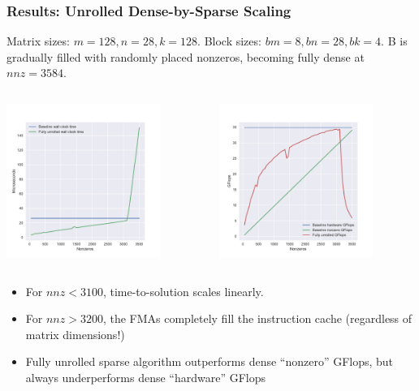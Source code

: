 \documentclass[9pt]{beamer}
\begin{document}
\begin{frame}[fragile]
  \frametitle{Results: Unrolled Dense-by-Sparse Scaling}
  Matrix sizes: $m=128, n=28, k=128$. Block sizes: $bm=8, bn=28, bk=4$.
  B is gradually filled with randomly placed nonzeros, becoming fully dense at $nnz=3584$.

  \begin{columns}[t]
    \begin{column}{0.45\textwidth}
      \centering
      \includegraphics[width=5cm]{images/unrolled_scaling_time.pdf}
    \end{column}
    \begin{column}{0.45\textwidth}
      \centering
      \includegraphics[width=5cm]{images/unrolled_scaling_flops.pdf}
    \end{column}
  \end{columns}

  \begin{itemize}
    \item For $nnz < 3100$, time-to-solution scales linearly.
    \item For $nnz > 3200$, the FMAs completely fill the instruction cache (regardless of matrix dimensions!)
    \item Fully unrolled sparse algorithm outperforms dense ``nonzero'' GFlops, but always underperforms dense ``hardware'' GFlops
    
  \end{itemize}
\end{frame}
\end{document}
